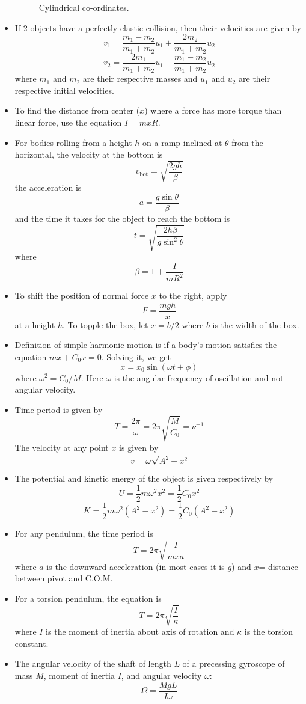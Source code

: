 \documentclass{scrartcl}
\begin{document}
\begin{itemize}
\begin{figure}[H]
\begin{minipage}[b]{0.4\textwidth}
                \caption{Cylindrical co-ordinates.}
            \end{minipage}
        \end{figure}
        \item If 2 objects have a perfectly elastic collision, then their velocities are given by \[v_1=\frac{m_1-m_2}{m_1+m_2}u_1+\frac{2m_2}{m_1+m_2}u_2\]\[v_2=\frac{2m_1}{m_1+m_2}u_1-\frac{m_1-m_2}{m_1+m_2}u_2\] where $m_1$ and $m_2$ are their respective masses and $u_1$ and $u_2$ are their respective initial velocities.
        \item To find the distance from center ($x$) where a force has more torque than linear force, use the equation $I=mxR$.
        \item For bodies rolling from a height $h$ on a ramp inclined at $\theta$ from the horizontal, the velocity at the bottom is \[v_\text{bot}=\sqrt{\frac{2gh}\beta}\] the acceleration is \[a=\frac{g\sin\theta}\beta\] and the time it takes for the object to reach the bottom is \[t=\sqrt{\frac{2h\beta}{g\sin^2\theta}}\] where \[\beta=1+\frac I{mR^2}\]
        \item To shift the position of normal force $x$  to the right, apply \[F=\frac{mgh}x\] at a height $h$. To topple the box, let $x=b/2$ where $b$ is the width of the box.
        \item Definition of simple harmonic motion is if a body's motion satisfies the equation $m\ddot x+C_0x=0$. Solving it, we get \[x=x_0\sin(\omega t+\phi)\] where $\omega^2=C_0/M$. Here $\omega$ is the angular frequency of oscillation and not angular velocity.
        \item Time period is given by \[T=\frac{2\pi}\omega=2\pi\sqrt{\frac M{C_0}}=\nu^{-1}\] The velocity at any point $x$ is given by\[v=\omega\sqrt{A^2-x^2}\]
        \item The potential and kinetic energy of the object is given respectively by \[U=\frac12m\omega^2x^2=\frac12C_0x^2\]\[K=\frac12m\omega^2(A^2-x^2)=\frac12C_0(A^2-x^2)\]
        \item For any pendulum, the time period is \[T=2\pi\sqrt{\frac I{mxa}}\] where $a$ is the downward acceleration (in most cases it is $g$) and $x$= distance between pivot and C.O.M.
        \item For a torsion pendulum, the equation is \[T=2\pi\sqrt{\frac I\kappa}\] where $I$ is the moment of inertia about axis of rotation and $\kappa$ is the torsion constant.
        \item The angular velocity of the shaft of length $L$  of a precessing  gyroscope of mass $M$, moment of inertia $I$, and angular velocity $\omega$: \[\Omega=\frac{MgL}{I\omega}\]
    \end{itemize}
\end{document}
